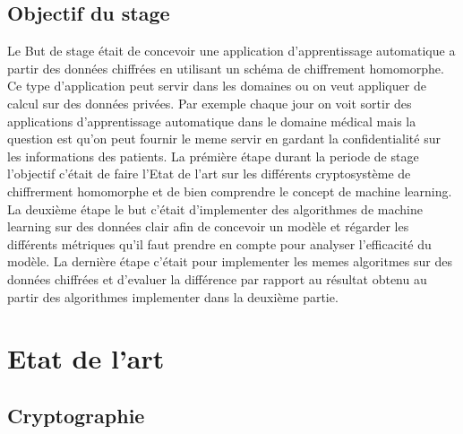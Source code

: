 \documentclass[a4paper,12pt]{article}
\begin{document}
\subsection{Objectif du stage}
Le But de  stage était de concevoir une application d'apprentissage automatique a partir des données chiffrées en utilisant un schéma de chiffrement homomorphe.\newline
Ce type d'application peut servir dans les domaines ou on veut appliquer de calcul sur des données privées.\newline
Par exemple chaque jour on voit sortir des applications d'apprentissage automatique dans le domaine médical mais la question est qu'on peut fournir le meme servir en gardant la confidentialité sur les informations des patients.\newline
La prémière étape durant la periode de stage l'objectif c'était de faire l'Etat de l'art sur les différents cryptosystème de chiffrerment homomorphe et de bien comprendre le concept de machine learning.\newline
La deuxième étape le but c'était d'implementer des algorithmes de machine learning sur des données clair afin de concevoir un modèle et régarder les différents métriques qu'il faut prendre en compte pour analyser l'efficacité du modèle.\newline
La dernière étape c'était pour implementer les memes algoritmes sur des données chiffrées et d'evaluer la différence par rapport au résultat obtenu au partir des algorithmes implementer dans la deuxième partie.\newline
\section{Etat de l'art} 
\subsection{Cryptographie}
\end{document}
